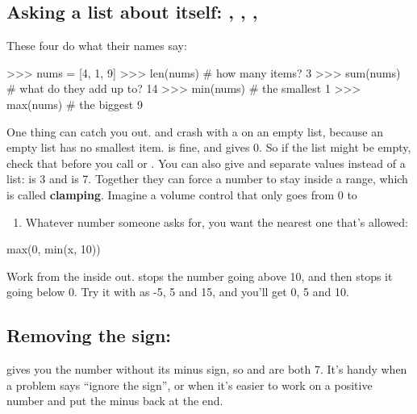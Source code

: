 \documentclass[10pt,a4paper]{article}
\begin{document}
\subsection{Asking a list about itself: , , , }
These four do what their names say:
\begin{txtcode}
>>> nums = [4, 1, 9]
>>> len(nums)         # how many items?
3
>>> sum(nums)         # what do they add up to?
14
>>> min(nums)         # the smallest
1
>>> max(nums)         # the biggest
9
\end{txtcode}
One thing can catch you out.  and  crash with a  on an empty list, because an empty list has no smallest item.  is fine, and gives 0. So if the list might be empty, check that before you call  or .
You can also give  and  separate values instead of a list:  is 3 and  is 7. Together they can force a number to stay inside a range, which is called \textbf{clamping}. Imagine a volume control that only goes from 0 to
\begin{enumerate}
\item Whatever number someone asks for, you want the nearest one that’s allowed:
\end{enumerate}
\begin{pycode}
max(0, min(x, 10))
\end{pycode}
Work from the inside out.  stops the number going above 10, and then  stops it going below 0. Try it with  as -5, 5 and 15, and you’ll get 0, 5 and 10.
\subsection{Removing the sign: }
 gives you the number without its minus sign, so  and  are both 7. It’s handy when a problem says “ignore the sign”, or when it’s easier to work on a positive number and put the minus back at the end.
\end{document}
